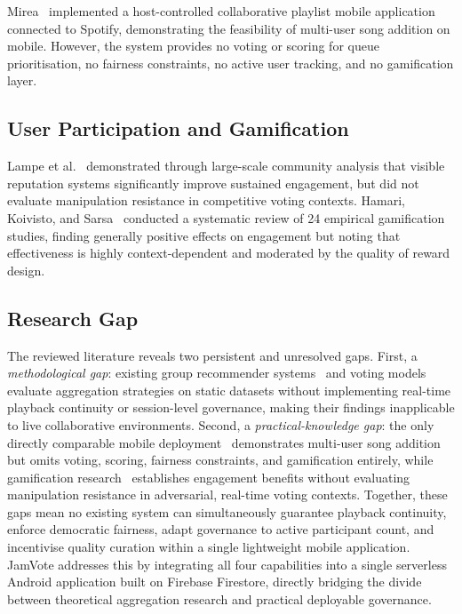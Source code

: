 \documentclass[pdflatex,sn-mathphys-num,iicol]{sn-jnl}
\theoremstyle{thmstyleone}%
\theoremstyle{thmstyletwo}%
\theoremstyle{thmstylethree}%
\begin{document}
Mirea~\cite{jamvote_queue_mirea} implemented a host-controlled collaborative playlist
mobile application connected to Spotify, demonstrating the feasibility of multi-user song
addition on mobile. However, the system provides no voting or scoring for queue
prioritisation, no fairness constraints, no active user tracking, and no gamification
layer.

\subsection{User Participation and Gamification}

Lampe et al.~\cite{jamvote_online_community_motivation} demonstrated through large-scale
community analysis that visible reputation systems significantly improve sustained
engagement, but did not evaluate manipulation resistance in competitive voting contexts.
Hamari, Koivisto, and Sarsa~\cite{jamvote_gamification_works} conducted a systematic
review of 24 empirical gamification studies, finding generally positive effects on
engagement but noting that effectiveness is highly context-dependent and moderated by the
quality of reward design.

\subsection{Research Gap}

The reviewed literature reveals two persistent and unresolved gaps. First, a
\textit{methodological gap}: existing group recommender
systems~\cite{jamvote_group_context_mdpi, jamvote_recommendation_groups} and voting
models~\cite{jamvote_arxiv_social_music} evaluate aggregation strategies on static
datasets without implementing real-time playback continuity or session-level governance,
making their findings inapplicable to live collaborative environments. Second, a
\textit{practical-knowledge gap}: the only directly comparable mobile
deployment~\cite{jamvote_queue_mirea} demonstrates multi-user song addition but omits
voting, scoring, fairness constraints, and gamification entirely, while gamification
research~\cite{jamvote_gamification_works, jamvote_online_community_motivation}
establishes engagement benefits without evaluating manipulation resistance in adversarial,
real-time voting contexts. Together, these gaps mean no existing system can simultaneously
guarantee playback continuity, enforce democratic fairness, adapt governance to active
participant count, and incentivise quality curation within a single lightweight mobile
application. JamVote addresses this by integrating all four capabilities into a single
serverless Android application built on Firebase Firestore, directly bridging the divide
between theoretical aggregation research and practical deployable governance.
\end{document}
